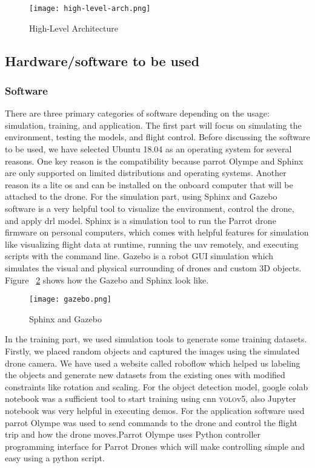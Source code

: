 \documentclass[../main.tex]{subfiles}
\begin{document}
\begin{figure}[H]
	\centering
	\texttt{[image: high-level-arch.png]}
	\caption{High-Level Architecture}\label{fig1:arch-fig}
\end{figure}


\subsection{Hardware/software to be used}

\subsubsection{Software}
There are three primary categories of software depending on the usage: simulation, training, and application. The first part will focus on simulating the environment, testing the models, and flight control. Before discussing the software to be used, we have selected Ubuntu 18.04 as an operating system for several reasons. One key reason is the compatibility because parrot Olympe and Sphinx are only supported on limited distributions and operating systems. Another reason its a lite os and can be installed on the onboard computer that will be attached to the drone. For the simulation part, using Sphinx and Gazebo software is a very helpful tool to visualize the environment, control the drone, and apply \gls{drl} model. Sphinx is a simulation tool to run the Parrot drone firmware on personal computers, which comes with helpful features for simulation like visualizing flight data at runtime, running the \gls{uav} remotely, and executing scripts with the command line. Gazebo is a robot GUI simulation which simulates the visual and physical surrounding of drones and custom 3D objects. Figure ~\ref{fig2:gazebo} shows how the Gazebo and Sphinx look like. \begin{figure}[H]
	\centering
	\texttt{[image: gazebo.png]}
	\caption{Sphinx and Gazebo }\label{fig2:gazebo}
\end{figure}
In the training part, we used simulation tools to generate some training datasets. Firstly, we placed random objects and captured the images using the simulated drone camera. We have used a website called roboflow which helped us labeling the objects and generate new datasets from the existing ones with modified constraints like rotation and scaling. For the object detection model, google colab notebook was a sufficient tool to start training using \gls{cnn} \textsc{yolo}v5, also Jupyter notebook was very helpful in executing demos. For the application software used parrot Olympe was used to send commands to the drone and control the flight trip and how the drone moves.Parrot Olympe uses Python controller programming interface for Parrot Drones which will make controlling simple and easy using a python script.
\end{document}
